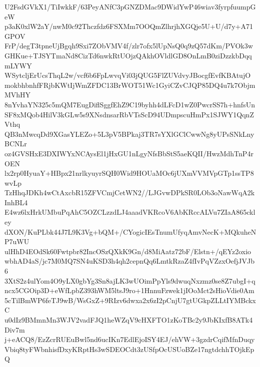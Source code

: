 U2FsdGVkX1/TiIwkkF/63PeyANfC3pGNZDMac9DWidYwP46wiav3fyrpfuumpGeW
p3aK0xlW2aY/nwM0c92Thczfdz6FSXMm7OOQmZlhrjhXGQje5U+U/d7y+A71GPOV
FrP/degT3tpneUjBgqh9Sxi7ZObVMV4f/zlr7ofx5lUpNsQ0q9zQ57dKm/PVOk3w
GHKue+TJSYTmaNd8CizTd6nwkRtUOjzQAkhOVldlGD8OnLmB0ziDzzkbDqqmLYWY
WSytcljErUcsThqL2w/vcf6b6FpLwvqVi03jQUG5FlZUVdvyJBocgfEvfKBAtujO
mokbhbnhfFRjbKWtIjWmZFDC13BrWOT51Wc1GyiCZvCJQP85DQ4u7k7ObjmMVhHY
8nYvhaYN325c5mQM7EugDiflSggfEhZ9C19byhh4dLFcD1wZ0PwcrSS7h+hnfsUn
SF8xMQob4HilV3kGLw5s9XNsdnsarRbVTsScD94UDmpscuHmPx1SJWY1QqnZVthq
QB3nMwcqDd9XGasYLEZo+5L3pV5BPkaj3TR7sYXlGClCwwNg8yUPsSNkLnyBCNLr
oz4GVSHxE3DXIWYxNCAysEl1jHxGU1nLgyNfsBbStS5aeKQII/HwzMdhTnP4rOEN
lx2rp0HyuaY+HBpx21nrlkyuyrSQH0Wid9HOUaMOc6jUXmVVMVpGTp1ssTP8wvLp
TzHhqJDKh4wCtAxcbR15ZFVCmjCetWN2//LJGvwDPkSR0LOb3oNawWqA2kInhBL4
E4wz6lxHrkUMbuPqAhC5OZCLzzdLJ4aaadVKRcoV6AbKRccALVu7ZIaA865ckley
dXON/KuPLbk44J7L9K3Vg+bQM+/CYogicIEsTnumUfyqAmvNecK+MQkuheNP7uWU
ulHhD4EOdSk60Fwtpbr82IncOSzQXkK9Gn/d8MiAatz72bF/Elstn+/qEYz2oxio
wbhAD4aS/jc7M0MQ7SN4uKSD3h4qh2cepnQq6LmtkRzaZ4fIvPqVZzxOefjJVJb6
3XtS2z4ulYom4O9yLX0gbYg3Sn8ajLK3wUOimPpYls9dwuqNxzmz0se8Z7ubgI+q
ncx5CGOip3D+eWfLpbZ393hWM5ltsJ9ro+1HnnuFzwek1jIOoMct2sHioVdie0Am
5cTilBmWP6feTJ9wB/WsGxZ+9RIzv6dwxa2x6zI2pCnjU7gtUGkpZLLtIYMBckxC
u0dIz9BMmnMn3WJV2vadFJQ1heWZqV9cHXFTO1zKoTBc2y9JbKIxfB8ATk4Div7m
j+eACQ8/EzZcrRUEuBwl5nd6ucIKn7EdlEjoISY4EJ/ehVW+3gzdrCqifMfnDuqy
Vbiq8tyFWbnhisfDxyKRptHs3wSDEOCdt3zUSfpOcUSUoBZe17ngtdchhTOjkEpQ

